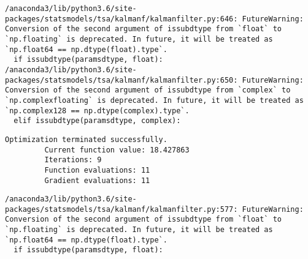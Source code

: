 \documentclass[11pt]{article}
\begin{document}
    \begin{Verbatim}[commandchars=\\\{\}]
/anaconda3/lib/python3.6/site-packages/statsmodels/tsa/kalmanf/kalmanfilter.py:646: FutureWarning: Conversion of the second argument of issubdtype from `float` to `np.floating` is deprecated. In future, it will be treated as `np.float64 == np.dtype(float).type`.
  if issubdtype(paramsdtype, float):
/anaconda3/lib/python3.6/site-packages/statsmodels/tsa/kalmanf/kalmanfilter.py:650: FutureWarning: Conversion of the second argument of issubdtype from `complex` to `np.complexfloating` is deprecated. In future, it will be treated as `np.complex128 == np.dtype(complex).type`.
  elif issubdtype(paramsdtype, complex):

    \end{Verbatim}

    \begin{Verbatim}[commandchars=\\\{\}]
Optimization terminated successfully.
         Current function value: 18.427863
         Iterations: 9
         Function evaluations: 11
         Gradient evaluations: 11

    \end{Verbatim}

    \begin{Verbatim}[commandchars=\\\{\}]
/anaconda3/lib/python3.6/site-packages/statsmodels/tsa/kalmanf/kalmanfilter.py:577: FutureWarning: Conversion of the second argument of issubdtype from `float` to `np.floating` is deprecated. In future, it will be treated as `np.float64 == np.dtype(float).type`.
  if issubdtype(paramsdtype, float):

    \end{Verbatim}
\end{document}

